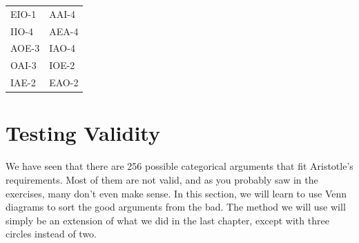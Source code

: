 \begin{exercises} 
\begin{longtabu}{X[1]X[1]}
\item EIO-1  

&

\item AAI-4  

\\[-15pt]

\item IIO-4 

  &

\item AEA-4 

\\[-15pt]

\item AOE-3 

&

\item IAO-4 

\\[-15pt]

\item OAI-3 

&

\item IOE-2 

\\[-15pt]

\item IAE-2

  &

\item EAO-2 

\\[-15pt]

\end{longtabu}
\end{exercises}  

            
\section{Testing Validity}
\label{sec:testing_validity}
We have seen that there are 256 possible categorical arguments that fit Aristotle's requirements. Most of them are not valid, and as you probably saw in the exercises, many don't even make sense. In this section, we will learn to use Venn diagrams to sort the good arguments from the bad. The method we will use will simply be an extension of what we did in the last chapter, except with three circles instead of two. 

